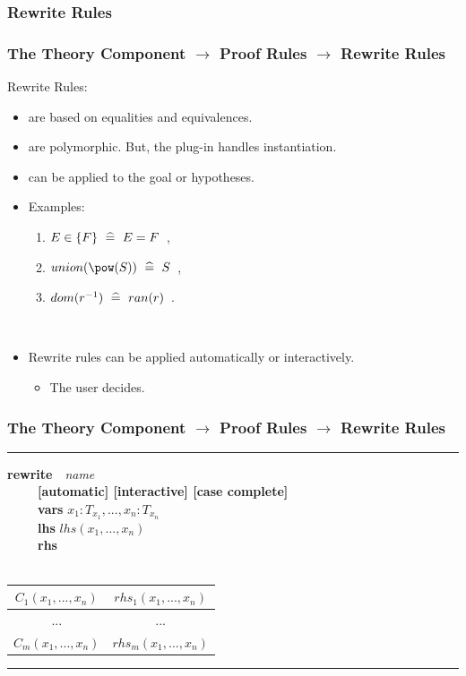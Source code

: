 \documentclass{beamer}
\begin{document}
\subsubsection{Rewrite Rules}
	\begin{frame}
		\frametitle{The Theory Component $\rightarrow$ Proof Rules $\rightarrow$ Rewrite Rules}
		Rewrite Rules:
		\begin{itemize}
			\item are based on equalities and equivalences.
			\item are polymorphic. But, the plug-in handles instantiation.
			\item can be applied to the goal or hypotheses.
		\end{itemize}


		\begin{itemize}
			\item Examples:
				\begin{enumerate}
					\item $E \in \{F\} ~\mathrel{\widehat=}~ E=F$~,
					\item $union(\pow(S))~\defi~ S$~,
					\item $dom(r^{-1}) ~\mathrel{\widehat=}~ ran(r)$~.
				\end{enumerate}

~

			\item Rewrite rules can be applied automatically or interactively.
			\begin{itemize}
				\item The user decides.
			\end{itemize}
		\end{itemize}
	\end{frame}
	\begin{frame}
		\frametitle{The Theory Component $\rightarrow$ Proof Rules $\rightarrow$ Rewrite Rules}
		\hrule
		\vspace{4pt}
		\textbf{rewrite}~~\textit{name}\\
		$~~~~~~~~~~~$\textbf{[automatic] [interactive] [case complete]}\\
		$~~~~~~~~~~~$\textbf{vars} $x_1:T_{x_1},..., x_n:T_{x_n}$\\
		$~~~~~~~~~~~$\textbf{lhs} $lhs(x_1,..., x_n)$\\
		$~~~~~~~~~~~$\textbf{rhs}\\
		$~~~~~~~~~~~~~~~~$
		\begin{tabular}{|c|c|}
			\hline
				$C_1(x_1,..., x_n)$ & $rhs_1(x_1,..., x_n)$\\\hline
				... & ...\\\hline
				$C_m(x_1,..., x_n)$ & $rhs_m(x_1,..., x_n)$\\
			\hline 
		\end{tabular}
		\vspace{4pt}
		\hrule
		\vspace{3pt}
	\end{frame}
\end{document}
